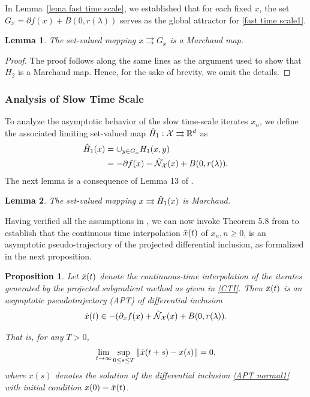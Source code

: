 \documentclass[9pt,journal,twoside,web]{ieeecolor}
\newtheorem{proposition}{Proposition}
\newtheorem{lemma}{Lemma}
\newcommand{\norm}[1]{\left\lVert #1 \right\rVert}
\begin{document}
In Lemma~\ref{lema fast time scale}, we established that for each fixed $x$, the set $G_x = \partial f(x) + B (0,r(\lambda))$ serves as the global attractor for \eqref{fast time scale1}.

\begin{lemma}
    The set-valued mapping $x \rightrightarrows G_x$ is a Marchaud map. 
\end{lemma}

\begin{proof}
   The proof follows along the same lines as the argument used to show that $H_2$ is a Marchaud map. Hence, for the sake of brevity, we omit the details.
\end{proof}

\subsubsection{ Analysis of Slow Time Scale}
To analyze the asymptotic behavior of the slow time-scale iterates $x_n$, we define the associated limiting set-valued map $\Hat{H}_1 : \mathcal{X} \rightrightarrows \mathbb{R}^d$ as 
\begin{equation*}
\begin{split}
    \Hat{H}_1 (x) & = \cup_{y \in G_x} H_1(x,y)
    \\ & = - \partial f(x) - \Hat{\mathcal{N}}_\mathcal{X}(x) + B(0, r(\lambda)).
    \end{split}
\end{equation*}
The next lemma is a consequence of Lemma 13 of \cite{yaji2020stochastic}. 

\begin{lemma}
    The set-valued mapping $x \rightrightarrows \Hat{H}_1(x)$ is  Marchaud. 
\end{lemma}

Having verified all the assumptions in \cite{yaji2020stochastic}, we can now invoke Theorem 5.8 from \cite{yaji2020stochastic} to establish that the continuous time interpolation $\Bar{x}(t)$ of ${x_n}, n\geq 0$, is an asymptotic pseudo-trajectory of the projected differential inclusion, as formalized in the next proposition.

\begin{proposition}
      Let $\Bar{x}(t)$ denote the continuous-time interpolation of the iterates generated by the projected subgradient method as given in \eqref{CTI}. Then $\Bar{x}(t)$ is an asymptotic pseudotrajectory (APT) of differential inclusion \begin{equation} \begin{split} \Dot{x} (t) \in - (\partial_x f(x) + \Hat{\mathcal{N}}_\mathcal{X}(x) + B(0,r(\lambda)).
    \end{split}
    \label{APT normal1}
\end{equation}
    
    That is, for any  $T > 0$, 
     \begin{equation*}
\lim\limits_{t \to \infty}  \sup\limits_{0 \leq s \leq T} \norm{\Bar{x}(t+s)-x(s)} = 0,
\end{equation*}
where $x(s)$ denotes the solution of the differential inclusion \eqref{APT normal1} with initial condition $x(0) = \Bar{x}(t)$.
\label{AST1p}
\end{proposition}
\end{document}
